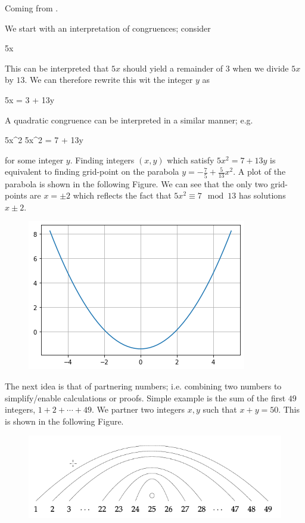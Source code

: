 
Coming from \cite{Weissman2017}.

We start with an interpretation of congruences; consider

\bee
5x  
\eee

This can be interpreted that $5x$ should yield a remainder of $3$ when we divide $5x$ by $13$. We can therefore rewrite this wit the integer $y$ as

\bee
5x = 3 + 13y
\eee

A quadratic congruence can be interpreted in a similar manner; e.g.

\bee
5x^2   \leftrightarrow 5x^2 = 7 + 13y
\eee

for some integer $y$. Finding integers $(x,y)$ which satisfy $5x^2 = 7 + 13y$ is equivalent to finding grid-point on the parabola $y = - \frac{7}{5} + \frac{5}{13}x^2$. A plot of the parabola is shown in the following Figure. We can see that the only two grid-points are $x = \pm 2$ which reflects the fact that $5x^2 \equiv 7 \mod 13$ has solutions $x \pm 2$.

\begin{figure}[H]
    \centering
    \includegraphics[scale=0.75]{images/2023-02-22-quadr_con_01.png}
\end{figure}

The next idea is that of partnering numbers; i.e. combining two numbers to simplify/enable calculations or proofs. Simple example is the sum of the first $49$ integers, $1 + 2 + \cdots + 49$. We partner two integers $x, y$ such that $x + y = 50$. This is shown in the following Figure.

\begin{figure}[H]
    \centering
    \includegraphics[scale=0.75]{images/2023-02-22-quadr_con_02.png}
\end{figure}

